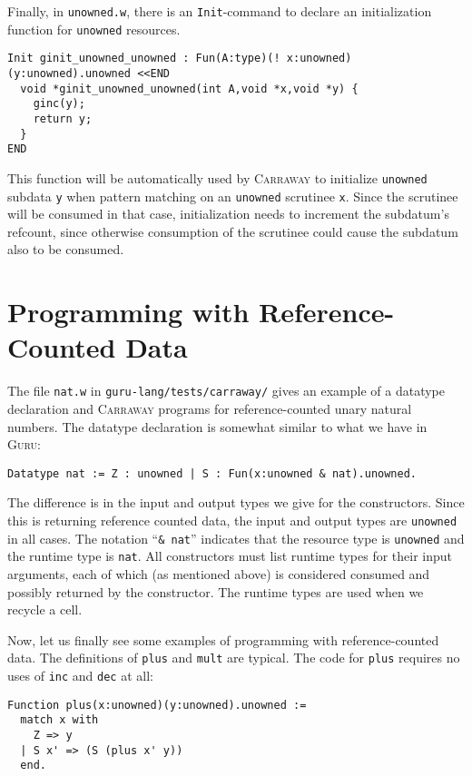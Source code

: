\documentclass{book}[12pt]
\newcommand{\guru}[0]{\textsc{Guru}\xspace}
\newcommand{\carraway}[0]{\textsc{Carraway}\xspace}
\begin{document}
\noindent Finally, in \texttt{unowned.w}, there is an \texttt{Init}-command
to declare an initialization function for \texttt{unowned} resources.  

\begin{verbatim}
Init ginit_unowned_unowned : Fun(A:type)(! x:unowned)(y:unowned).unowned <<END
  void *ginit_unowned_unowned(int A,void *x,void *y) {
    ginc(y);
    return y;
  }
END
\end{verbatim}

\noindent This function will be automatically used by \carraway to
initialize \texttt{unowned} subdata \texttt{y} when pattern matching
on an \texttt{unowned} scrutinee \texttt{x}.  Since the scrutinee will
be consumed in that case, initialization needs to increment the
subdatum's refcount, since otherwise consumption of the scrutinee
could cause the subdatum also to be consumed.

\section{Programming with Reference-Counted Data}
\label{ch9:prog}

The file \texttt{nat.w} in \texttt{guru-lang/tests/carraway/} gives an
example of a datatype declaration and \carraway programs for
reference-counted unary natural numbers.  The datatype declaration
is somewhat similar to what we have in \guru:

\begin{verbatim}
Datatype nat := Z : unowned | S : Fun(x:unowned & nat).unowned.
\end{verbatim}

\noindent The difference is in the input and output types we give for
the constructors.  Since this is returning reference counted data, the
input and output types are \texttt{unowned} in all cases.  The
notation ``\texttt{\& nat}'' indicates that the resource type is
\texttt{unowned} and the runtime type is \texttt{nat}.  All
constructors must list runtime types for their input arguments, each
of which (as mentioned above) is considered consumed and possibly
returned by the constructor.  The runtime types are used when we
recycle a cell.

Now, let us finally see some examples of programming with
reference-counted data.  The definitions of \texttt{plus} and
\texttt{mult} are typical.  The code for \texttt{plus} requires
no uses of \texttt{inc} and \texttt{dec} at all:

\begin{verbatim}
Function plus(x:unowned)(y:unowned).unowned :=
  match x with
    Z => y
  | S x' => (S (plus x' y))
  end.
\end{verbatim}
\end{document}
